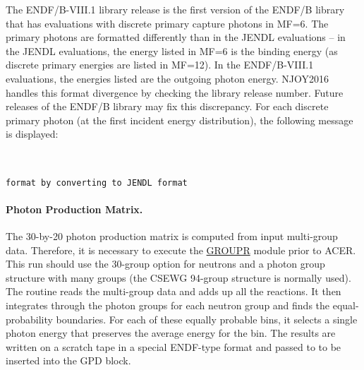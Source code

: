 The ENDF/B-VIII.1 library release is the first version of the ENDF/B library 
that has evaluations with discrete primary capture photons in MF=6. The 
primary photons are formatted differently than in the JENDL evaluations -- in
the JENDL evaluations, the energy listed in MF=6 is the binding energy (as discrete
primary energies are listed in MF=12). In the ENDF/B-VIII.1 evaluations, the 
energies listed are the outgoing photon energy. NJOY2016 handles this format
divergence by checking the library release number. Future releases of the ENDF/B 
library may fix this discrepancy. For each discrete primary photon (at the first
incident energy distribution), the following message is displayed:

\begin{description}
\begin{singlespace}

\item[\cword{message from acelpp---Handling ENDF-8.1 discrete primary gamma }]~\par
  \texttt{format by converting to JENDL format}

\end{singlespace}
\end{description}

\paragraph{Photon Production Matrix.}
The 30-by-20 photon production matrix is computed from input
multi-group data.  Therefore, it is necessary to execute the
\hyperlink{sGROUPRhy}{GROUPR} module
prior to ACER.  This run should use the 30-group option
for neutrons and a photon group structure with many groups (the
CSEWG 94-group structure
is normally used).  The 
routine reads the multi-group data and adds up all the
reactions.  It then integrates through the photon groups
for each neutron group and finds the equal-probability
boundaries.  For each of these equally probable bins, it
selects a single photon energy that preserves the average
energy for the bin.  The results are written on a scratch
tape in a special ENDF-type format and passed to 
to be inserted into the GPD block.

